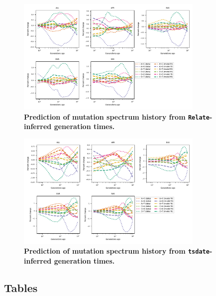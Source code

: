 \documentclass[]{article}
\newcommand{\tsdate}{\texttt{tsdate}\xspace}
\newcommand{\relate}{\texttt{Relate}\xspace}
\begin{document}
\begin{figure}[ht!]
    \centering
    \includegraphics[width=0.8\textwidth]{../plots/goodness-of-fit.DM.relate.max_age.10000.pdf}
    \caption{
        \textbf{Prediction of mutation spectrum history from
        \relate-inferred generation times.}
    }
    \label{fig:relate-fit}
\end{figure}


\begin{figure}[ht!]
    \centering
    \includegraphics[width=0.8\textwidth]{../plots/goodness-of-fit.DM.tsdate.max_age.10000.pdf}
    \caption{
        \textbf{Prediction of mutation spectrum history from
        \tsdate-inferred generation times.}
    }
    \label{fig:tsdate-fit}
\end{figure}


\clearpage

\subsection*{Tables}
\end{document}

